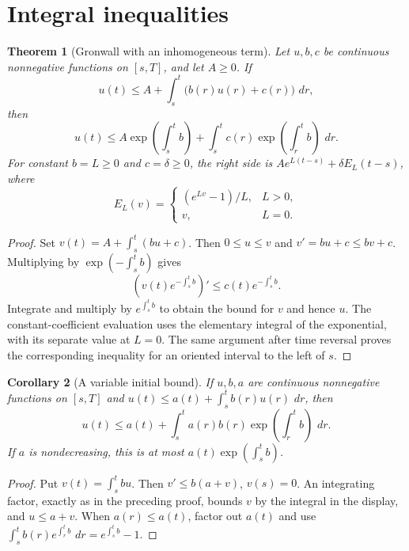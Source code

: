 \documentclass[11pt,oneside]{book}
\newtheorem{theorem}{Theorem}[chapter]
\newtheorem{corollary}[theorem]{Corollary}
\theoremstyle{definition}
\theoremstyle{remark}\newtheorem{remark}[theorem]{Remark}
\newcommand{\dd}{\,d}\newcommand{\id}{\operatorname{id}}
\begin{document}
\section{Integral inequalities}
\begin{theorem}[Gronwall with an inhomogeneous term]\label{d13:05:gronwall}
Let $u,b,c$ be continuous nonnegative functions on $[s,T]$, and let
$A\geq0$. If
\[
 u(t)\leq A+\int_s^t\bigl(b(r)u(r)+c(r)\bigr)\,\dd r,
\]
then
\[
 u(t)\leq A\exp\left(\int_s^t b\right)
       +\int_s^t c(r)\exp\left(\int_r^t b\right)\,\dd r.
\]
For constant $b=L\geq0$ and $c=\delta\geq0$, the right side is
$Ae^{L(t-s)}+\delta E_L(t-s)$, where
\[
 E_L(v)=\begin{cases}(e^{Lv}-1)/L,&L>0,\\v,&L=0.\end{cases}
\]
\end{theorem}
\begin{proof}
Set $v(t)=A+\int_s^t(bu+c)$. Then $0\leq u\leq v$ and
$v'=bu+c\leq bv+c$. Multiplying by
$\exp(-\int_s^t b)$ gives
\[
 \left(v(t)e^{-\int_s^t b}\right)'
       \leq c(t)e^{-\int_s^t b}.
\]
Integrate and multiply by $e^{\int_s^t b}$ to obtain the bound for
$v$ and hence $u$. The constant-coefficient evaluation uses the
elementary integral of the exponential, with its separate value at
$L=0$. The same argument after time reversal proves the corresponding
inequality for an oriented interval to the left of $s$.
\end{proof}

\begin{corollary}[A variable initial bound]\label{d13:05:general-gronwall}
If $u,b,a$ are continuous nonnegative functions on $[s,T]$ and
$u(t)\leq a(t)+\int_s^t b(r)u(r)\,\dd r$, then
\[
 u(t)\leq a(t)+\int_s^t a(r)b(r)
                \exp\left(\int_r^t b\right)\,\dd r.
\]
If $a$ is nondecreasing, this is at most
$a(t)\exp(\int_s^t b)$.
\end{corollary}
\begin{proof}
Put $v(t)=\int_s^t bu$. Then $v'\leq b(a+v)$, $v(s)=0$.
An integrating factor, exactly as in the preceding proof, bounds $v$
by the integral in the display, and $u\leq a+v$. When $a(r)\leq a(t)$,
factor out $a(t)$ and use
$\int_s^t b(r)e^{\int_r^t b}\,\dd r=e^{\int_s^t b}-1$.
\end{proof}
\end{document}
